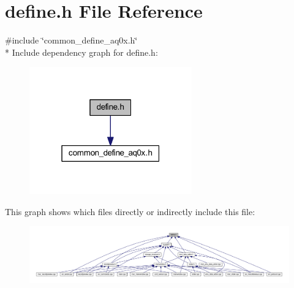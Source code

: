 \hypertarget{a00034}{\section{define.\+h File Reference}
\label{a00034}
}
{\ttfamily \#include \char`\"{}common\+\_\+define\+\_\+aq0x.\+h\char`\"{}}\\*
Include dependency graph for define.\+h\+:
\nopagebreak
\begin{figure}[H]
\begin{center}
\leavevmode
\includegraphics[width=199pt]{d9/d7d/a00150}
\end{center}
\end{figure}
This graph shows which files directly or indirectly include this file\+:
\nopagebreak
\begin{figure}[H]
\begin{center}
\leavevmode
\includegraphics[width=350pt]{dd/db2/a00151}
\end{center}
\end{figure}
